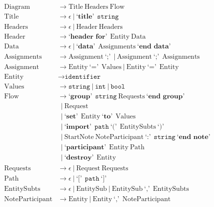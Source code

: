 \documentclass[11pt]{article}
\begin{document}
\newcommand{\str}{\texttt{string}\ }
\newcommand{\opt}{|\ }
\newcommand{\terminal}[1]{\textbf{`#1'}\ }
\newcommand{\nt}[1]{\mathrm{#1}}

\begin{align*}
\nt{Diagram} & \rightarrow \nt{Title}\ \nt{Headers}\ \nt{Flow} \\
\nt{Title} & \rightarrow \epsilon\ \opt \terminal{title}\ \str \\
\nt{Headers} & \rightarrow  \epsilon\ \opt \nt{Header}\ \nt{Headers} \\
\nt{Header} & \rightarrow  \terminal{header for}\ \nt{Entity}\ \nt{Data} \\
\nt{Data} & \rightarrow \epsilon\ \opt \terminal{data}\  \nt{Assignments}\ \terminal{end data} \\ 
\nt{Assignments} & \rightarrow \nt{Assignment}\ \terminal{;}\ \opt \nt{Assignment}\ \terminal{;}\ \nt{Assignments}  \\ 
\nt{Assignment} & \rightarrow \nt{Entity}\ \terminal{=}\ \nt{Values}\ \opt \nt{Entity}\ \terminal{=}\ \nt{Entity} \\
\nt{Entity} & \rightarrow \texttt{identifier}\\
\nt{Values} & \rightarrow \str \opt \texttt{int}\ |\ \texttt{bool}\\
\nt{Flow} & \rightarrow \terminal{group}\ \str \nt{Requests}\ \terminal{end group}\\ 
         &\ \ \opt \nt{Request} \\
         &\ \ \opt \terminal{set}\ \nt{Entity}\ \terminal{to}\ \nt{Values} \\
         &\ \ \opt \terminal{import}\ \texttt{path}\ \terminal{(}\ \nt{EntitySubts}\ \terminal{)}\  \\
         &\ \ \opt \nt{StartNote}\ \nt{NoteParticipant}\ \terminal{:}\ \str \terminal{end note}\\
         &\ \ \opt \terminal{participant}\ \nt{Entity}\ \nt{Path}\\
         &\ \ \opt \terminal{destroy}\ \nt{Entity}\\
\nt{Requests} & \rightarrow \epsilon\ \opt \nt{Request}\ \nt{Requests}\\
\nt{Path} & \rightarrow \epsilon\ \opt \terminal{[}\ \texttt{path}\ \terminal{]}\\
\nt{EntitySubts} & \rightarrow \epsilon\ \opt \nt{EntitySub}\ \opt \nt{EntitySub}\ \terminal{,}\ \nt{EntitySubts}\\
\nt{NoteParticipant} & \rightarrow \nt{Entity}\ \opt  \nt{Entity}\ \terminal{,}\ \nt{NoteParticipant}\\

\end{align*}
\end{document}
